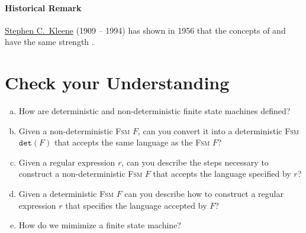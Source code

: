 \paragraph{Historical Remark}
\href{http://en.wikipedia.org/wiki/Stephen_Cole_Kleene}{Stephen C.~Kleene} (1909 -- 1994) has shown in 1956 that the concepts of 
 and  have the same strength
\cite{kleene:1956}.


\section{Check your Understanding}
\begin{enumerate}[(a)]
\item How are deterministic and non-deterministic finite state machines defined?
\item Given a non-deterministic \textsc{Fsm} $F$, can you convert it into a deterministic \textsc{Fsm}
      $\mathtt{det}(F)$ that accepts the same language as the \textsc{Fsm} $F$?
\item Given a regular expression $r$, can you describe the steps necessary to construct a non-deterministic
      \textsc{Fsm} $F$ that accepts the language specified by $r$?
\item Given a deterministic \textsc{Fsm} $F$ can you describe how to construct a regular expression $r$
      that specifies the language accepted by $F$?
\item How do we mimimize a finite state machine?
\end{enumerate}

